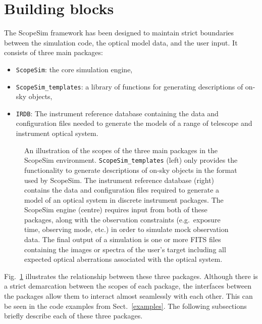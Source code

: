 

\section{Building blocks}
\label{building-blocks}

The ScopeSim framework has been designed to maintain strict boundaries
between the simulation code, the optical model data, and the user
input.  It consists of three main packages:
\begin{itemize}
\item \lstinline{ScopeSim}: the core simulation engine,

\item \lstinline{ScopeSim_templates}: a library of functions for
  generating descriptions of on-sky objects,

\item \lstinline{IRDB}: The instrument reference database containing
  the data and configuration files needed to generate the models of a
  range of telescope and instrument optical system.
\end{itemize}

\begin{figure}
  \caption{An illustration of the scopes of the three main packages in
    the ScopeSim environment.  \lstinline{ScopeSim_templates} (left)
    only provides the functionality to generate descriptions of on-sky
    objects in the format used by ScopeSim.  The instrument reference
    database (right) contains the data and configuration files
    required to generate a model of an optical system in discrete
    instrument packages.  The ScopeSim engine (centre) requires input
    from both of these packages, along with the observation
    constraints (e.g.~exposure time, observing mode, etc.) in order to
    simulate mock observation data.  The final output of a simulation
    is one or more FITS files containing the images or spectra of the
    user's target including all expected optical aberrations
    associated with the optical system.}
  \label{fig:framework}
\end{figure}

Fig.~\ref{fig:framework} illustrates the relationship between these
three packages.  Although there is a strict demarcation between the
scopes of each package, the interfaces between the packages allow them
to interact almost seamlessly with each other.  This can be seen in
the code examples from Sect.~\ref{examples}.  The following
subsections briefly describe each of these three packages.

